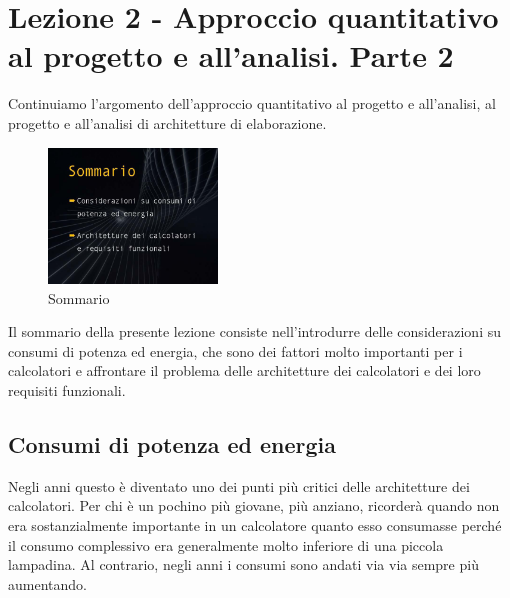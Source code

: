 \chapter{Lezione 2 - Approccio quantitativo al progetto e all'analisi. Parte 2}

Continuiamo l'argomento dell'approccio quantitativo al progetto e all'analisi, al progetto e all'analisi di architetture di elaborazione.

\FloatBarrier
\begin{figure}[H]
  \centering
  \includegraphics[width=0.40\textwidth,
                    trim=40 80 10 40, %
                    clip]
                    {images/Lez02_p01_fig_02.png}
  \caption{Sommario}
  \label{fig:Lez02_p01_fig_02}
\end{figure}
\FloatBarrier
\noindent

Il sommario della presente lezione consiste nell'introdurre delle considerazioni su consumi di potenza ed energia, che sono dei fattori molto importanti per i calcolatori e affrontare il problema delle architetture dei calcolatori e dei loro requisiti funzionali.

\section{Consumi di potenza ed energia}

Negli anni questo è diventato uno dei punti più critici delle architetture dei calcolatori.
Per chi è un pochino più giovane, più anziano, ricorderà quando non era sostanzialmente importante in un calcolatore quanto esso consumasse perché il consumo complessivo era generalmente molto inferiore di una piccola lampadina.
Al contrario, negli anni i consumi sono andati via via sempre più aumentando.

